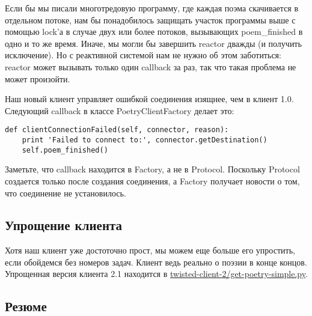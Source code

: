 Если бы мы писали многотредовую программу, где каждая 
поэма скачивается в отдельном потоке, нам бы 
понадобилось защищать участок программы выше с помощью 
lock'а в случае двух или более потоков, вызывающих 
poem\_finished в одно и то же время. Иначе, мы могли бы 
завершить reactor дважды (и получить исключение). Но с 
реактивной системой нам не нужно об этом заботиться: reactor 
может вызывать только один callback за раз, так что такая  
проблема не может произойти.


Наш новый клиент управляет ошибкой соединения 
изящнее, чем в клиент 1.0. Следующий callback в 
классе PoetryClientFactory делает это:

 \begin{verbatim}
def clientConnectionFailed(self, connector, reason):
    print 'Failed to connect to:', connector.getDestination()
    self.poem_finished()
\end{verbatim} 


Заметьте, что callback находится в Factory, а не в Protocol. 
Поскольку Protocol создается только после создания соединения, 
а Factory получает новости о том, что соединение не установилось.


\subsection{Упрощение клиента}


Хотя наш клиент уже достоточно прост, мы можем еще больше его 
упростить, если обойдемся без номеров задач. Клиент ведь реально 
о поэзии в конце концов. Упрощенная версия клиента 2.1 находится в   
\href{http://github.com/jdavisp3/twisted-intro/blob/master/twisted-client-2/get-poetry-simple.py}{twisted-client-2/get-poetry-simple.py}.

\subsection{Резюме}

